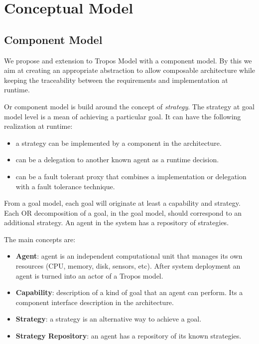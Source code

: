 \section{Conceptual Model}
\label{conceptual_model}

\subsection{Component Model}

We propose and extension to Tropos Model with a component model. By this we aim at creating an appropriate abstraction to allow composable architecture while keeping the traceability between the requirements and implementation at runtime.

Or component model is build around the concept of \textit{strategy}. The strategy at goal model level is a mean of achieving a particular goal. It can have the following realization at runtime:

\begin{itemize}
  \item a strategy can be implemented by a component in the architecture.
  \item can be a delegation to another known agent as a runtime decision.
  \item can be a fault tolerant proxy that combines a implementation or delegation with a fault tolerance technique.
\end{itemize}

From a goal model, each goal will originate at least a capability and strategy. Each OR decomposition of a goal, in the goal model, should correspond to an additional strategy.
An agent in the system has a repository of strategies.

The main concepts are:

\begin{itemize}
  \item \textbf{Agent}: agent is an independent computational unit that manages its own resources (CPU, memory, disk, sensors, etc). After system deployment an agent is turned into an actor of a Tropos model.
  \item \textbf{Capability}: description of a kind of goal that an agent can perform. Its a component interface description in the architecture.
  \item \textbf{Strategy}: a strategy is an alternative way to achieve a goal.
  \item \textbf{Strategy Repository}: an agent has a repository of its known strategies.
\end{itemize}

